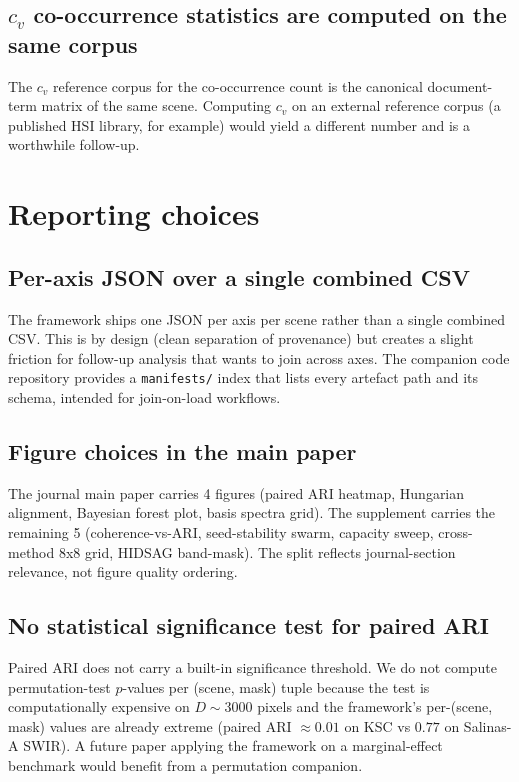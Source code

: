 \documentclass[11pt,a4paper]{article}
\begin{document}
\subsection{$c_v$ co-occurrence statistics are computed on the same
corpus}
The $c_v$ reference corpus for the co-occurrence count is the
canonical document-term matrix of the same scene. Computing $c_v$ on
an external reference corpus (a published HSI library, for example)
would yield a different number and is a worthwhile follow-up.

\section{Reporting choices}

\subsection{Per-axis JSON over a single combined CSV}
The framework ships one JSON per axis per scene rather than a single
combined CSV. This is by design (clean separation of provenance) but
creates a slight friction for follow-up analysis that wants to
join across axes. The companion code repository provides a
\texttt{manifests/} index that lists every artefact path and its
schema, intended for join-on-load workflows.

\subsection{Figure choices in the main paper}
The journal main paper carries 4 figures (paired ARI heatmap,
Hungarian alignment, Bayesian forest plot, basis spectra grid). The
supplement carries the remaining 5 (coherence-vs-ARI, seed-stability
swarm, capacity sweep, cross-method 8x8 grid, HIDSAG band-mask). The
split reflects journal-section relevance, not figure quality
ordering.

\subsection{No statistical significance test for paired ARI}
Paired ARI does not carry a built-in significance threshold. We do
not compute permutation-test $p$-values per (scene, mask) tuple
because the test is computationally expensive on $D \sim 3000$
pixels and the framework's per-(scene, mask) values are already
extreme (paired ARI $\approx 0.01$ on KSC vs $0.77$ on Salinas-A
SWIR). A future paper applying the framework on a marginal-effect
benchmark would benefit from a permutation companion.
\end{document}
